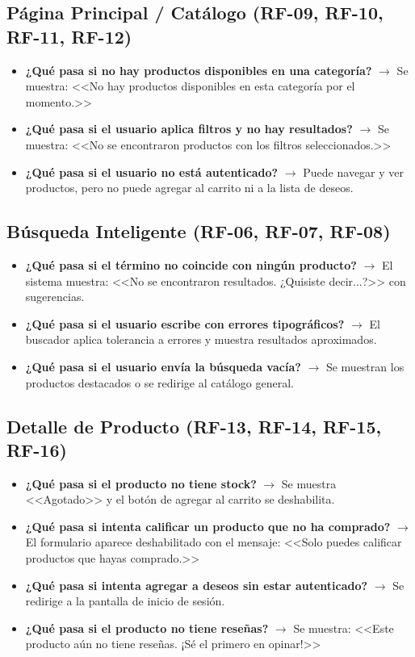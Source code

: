 \documentclass[12pt,a4paper]{article}
\begin{document}
\subsection{Página Principal / Catálogo (RF-09, RF-10, RF-11, RF-12)}
\begin{itemize}
    \item \textbf{¿Qué pasa si no hay productos disponibles en una categoría?} $\rightarrow$ Se muestra: <<No hay productos disponibles en esta categoría por el momento.>>
    \item \textbf{¿Qué pasa si el usuario aplica filtros y no hay resultados?} $\rightarrow$ Se muestra: <<No se encontraron productos con los filtros seleccionados.>>
    \item \textbf{¿Qué pasa si el usuario no está autenticado?} $\rightarrow$ Puede navegar y ver productos, pero no puede agregar al carrito ni a la lista de deseos.
\end{itemize}

\subsection{Búsqueda Inteligente (RF-06, RF-07, RF-08)}
\begin{itemize}
    \item \textbf{¿Qué pasa si el término no coincide con ningún producto?} $\rightarrow$ El sistema muestra: <<No se encontraron resultados. ¿Quisiste decir...?>> con sugerencias.
    \item \textbf{¿Qué pasa si el usuario escribe con errores tipográficos?} $\rightarrow$ El buscador aplica tolerancia a errores y muestra resultados aproximados.
    \item \textbf{¿Qué pasa si el usuario envía la búsqueda vacía?} $\rightarrow$ Se muestran los productos destacados o se redirige al catálogo general.
\end{itemize}

\subsection{Detalle de Producto (RF-13, RF-14, RF-15, RF-16)}
\begin{itemize}
    \item \textbf{¿Qué pasa si el producto no tiene stock?} $\rightarrow$ Se muestra <<Agotado>> y el botón de agregar al carrito se deshabilita.
    \item \textbf{¿Qué pasa si intenta calificar un producto que no ha comprado?} $\rightarrow$ El formulario aparece deshabilitado con el mensaje: <<Solo puedes calificar productos que hayas comprado.>>
    \item \textbf{¿Qué pasa si intenta agregar a deseos sin estar autenticado?} $\rightarrow$ Se redirige a la pantalla de inicio de sesión.
    \item \textbf{¿Qué pasa si el producto no tiene reseñas?} $\rightarrow$ Se muestra: <<Este producto aún no tiene reseñas. ¡Sé el primero en opinar!>>
\end{itemize}
\end{document}
